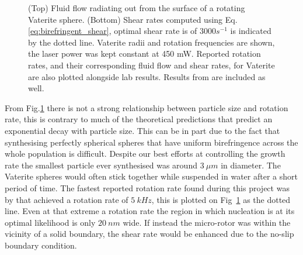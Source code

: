 \begin{figure}[h!]
\begin{subfigure}{0.75\linewidth}
	\end{subfigure}
	\caption{(Top) Fluid flow radiating out from the surface of a rotating 
		Vaterite sphere. (Bottom) Shear rates computed using Eq.\ref{eq:birefringent_shear}, optimal shear rate is of $3000 s^{-1}$ 
		is indicated by the dotted line. Vaterite radii and rotation frequencies 
		are shown, the laser power was kept constant at 450 mW. Reported rotation
		rates, and their corresponding fluid flow and shear rates, for Vaterite 
		are also plotted alongside lab results. Results from \cite{Parkin2009, Arita2016} are included as well.}
	\label{fig:vaterite_shear}
\end{figure}

From Fig.\ref{fig:vaterite_shear} there is not a strong relationship between
particle size and rotation rate, this is contrary to much of the theoretical
predictions that predict an exponential decay with particle size. This can
be in part due to the fact that synthesising perfectly spherical spheres that
have uniform birefringence across the whole population is difficult. Despite 
our best efforts at controlling the growth rate the smallest particle ever 
synthesised was around $3\ \mu m$ in diameter. The Vaterite spheres would 
often stick together while suspended in water after a short period of time. 
The fastest reported rotation rate found during this project was by 
\cite{Arita2016} that achieved a rotation rate of $5\ kHz$, this is plotted 
on Fig~\ref{fig:vaterite_shear} as the dotted line. Even at that extreme a 
rotation rate the region in which nucleation is at its optimal likelihood is 
only $20\ nm$ wide. If instead the micro-rotor was within the vicinity of a
solid boundary, the shear rate would be enhanced due to the no-slip boundary
condition.

